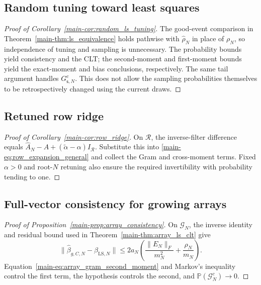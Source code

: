 \documentclass[11pt,a4paper,leqno]{article}
\numberwithin{equation}{section}
\numberwithin{figure}{section}
\numberwithin{table}{section}
\theoremstyle{plain}
\theoremstyle{definition}
\theoremstyle{remark}
\begin{document}
\subsection{Random tuning toward least squares}
\label{supp:proof-random-tuning}

\begin{proof}[Proof of Corollary~{\upshape\ref{main-cor:random_ls_tuning}}]
The good-event comparison in Theorem~\ref{main-thm:ls_equivalence} holds pathwise
with $\widehat\rho_N$ in place of $\rho_N$, so independence of tuning and
sampling is unnecessary. The probability bounds yield consistency and the CLT;
the second-moment and first-moment bounds yield the exact-moment and bias
conclusions, respectively. The same tail argument
handles $G_{\mathsf{s},N}^c$. This does not allow the sampling probabilities themselves
to be retrospectively changed using the current draws.
\end{proof}

\subsection{Retuned row ridge}
\label{supp:proof-row-ridge}

\begin{proof}[Proof of Corollary~{\upshape\ref{main-cor:row_ridge}}]
On $\mathcal R$, the inverse-filter difference equals
$\widehat A_N-A+(\widetilde\alpha-\alpha)I_{\mathcal R}$.
Substitute this into \eqref{main-eq:row_expansion_general} and collect the
Gram and cross-moment terms. Fixed $\alpha>0$ and root-$N$ retuning
also ensure the required invertibility with probability tending to one.
\end{proof}

\subsection{Full-vector consistency for growing arrays}
\label{supp:proof-array-consistency}

\begin{proof}[Proof of Proposition~{\upshape\ref{main-prop:array_consistency}}]
On \(\mathcal G_N\), the inverse identity and residual bound used in
Theorem~\ref{main-thm:array_ls_clt} give
\[
 \|\widehat\beta_{g,C,N}-\beta_{\mathrm{LS},N}\|
 \le2a_N\left(\frac{\|E_N\|_F}{m_N^2}+\frac{\rho_N}{m_N}\right).
\]
Equation~\eqref{main-eq:array_gram_second_moment} and Markov's inequality control
the first term, the hypothesis controls the second, and
\(\mathbb P(\mathcal G_N^c)\to0\).
\end{proof}
\end{document}
